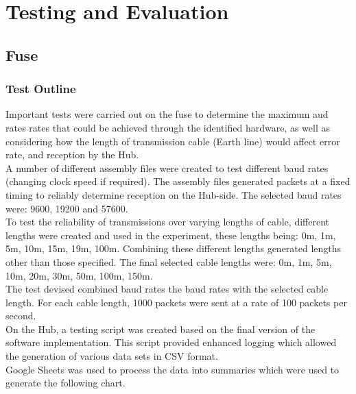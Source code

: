 \documentclass[preprint,12pt,3p]{elsarticle}
\begin{document}
\clearpage

\section{Testing and Evaluation}
\subsection{Fuse}
\subsubsection{Test Outline}
Important tests were carried out on the fuse to determine the maximum aud rates rates that could be achieved through the identified hardware, as well as considering how the length of transmission cable (Earth line) would affect error rate, and reception by the Hub.\\
A number of different assembly files were created to test different baud rates (changing clock speed if required). The assembly files generated packets at a fixed timing to reliably determine reception on the Hub-side. The selected baud rates were: 9600, 19200 and 57600.\\
To test the reliability of transmissions over varying lengths of cable, different lengths were created and used in the experiment, these lengths being: 0m, 1m, 5m, 10m, 15m, 19m, 100m. Combining these different lengths generated lengths other than those specified. The final selected cable lengths were: 0m, 1m, 5m, 10m, 20m, 30m, 50m, 100m, 150m.\\
The test devised combined baud rates the baud rates with the selected cable length. For each cable length, 1000 packets were sent at a rate of 100 packets per second.\\
On the Hub, a testing script was created based on the final version of the software implementation. This script provided enhanced logging which allowed the generation of various data sets in CSV format.\\
Google Sheets was used to process the data into summaries which were used to generate the following chart.
\end{document}
